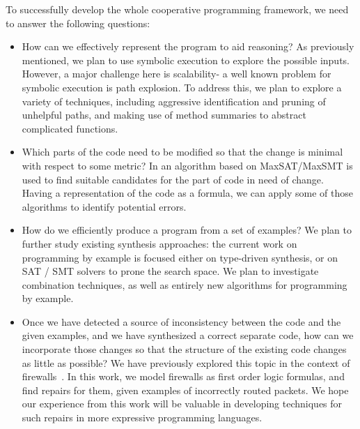 To successfully develop the whole cooperative programming framework, 
we need to answer the following questions:
\begin{itemize}
\item How can we effectively represent the program to aid reasoning?  As previously mentioned, we plan to use symbolic execution to explore the possible inputs.  However, a major challenge here is scalability- a well known problem for symbolic execution is path explosion.  To address this, we plan to explore a variety of techniques, including aggressive identification and pruning of unhelpful paths, and making use of method summaries to abstract complicated functions.
\item Which parts of the code need to be modified so that the change is minimal with respect to some metric? In \cite{jose2011cause, pavlinovic2014finding} 
an algorithm based on MaxSAT/MaxSMT is used to find suitable candidates for the part of code in need of change. Having a representation of the code as a formula, we can apply
some of those algorithms to identify potential errors.
\item How do we efficiently produce a program from a set of examples?
We plan to further study existing synthesis approaches: the current work on programming by example is focused either on type-driven synthesis, or on SAT / SMT solvers to prone the search space. We plan to investigate combination techniques, as well as entirely new algorithms for programming by example.
\item Once we have detected a source of inconsistency between the code and the given examples, and we have synthesized a correct separate code, how can we incorporate those changes so that the structure of the existing code changes as little as possible?
We have previously explored this topic in the context of firewalls~\cite{HallahanFMCAD17}.  In this work, we model firewalls as first order logic formulas, and find repairs for them, given examples of incorrectly routed packets.  We hope our experience from this work will be valuable in developing techniques for such repairs in more expressive programming languages.
\end{itemize}

